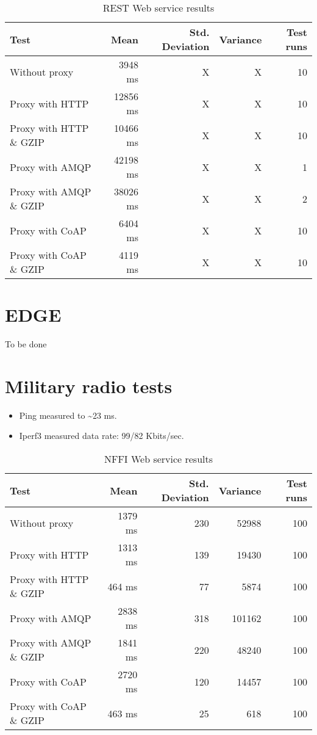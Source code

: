 \begin{appendices}
\begin{table}[H]
\begin{tabular}{| l | r | r | r | r |}
\hline
  \textbf{Test} & \textbf{Mean} & \textbf{Std. Deviation} & \textbf{Variance} & \textbf{Test runs}\\ \hline
  Without proxy & 3948 ms & X & X & 10 \\ \hline
  Proxy with HTTP & 12856 ms & X & X & 10 \\ \hline
  Proxy with HTTP \& GZIP & 10466 ms & X & X & 10 \\ \hline
  Proxy with AMQP & 42198 ms & X & X & 1 \\ \hline
  Proxy with AMQP \& GZIP & 38026 ms & X & X & 2\\ \hline
  Proxy with CoAP & 6404 ms & X & X & 10 \\ \hline
  Proxy with CoAP \& GZIP & 4119 ms & X & X & 10 \\ \hline
\end{tabular}
\caption{REST Web service results}
\end{table}


\section{EDGE}

To be done



\section{Military radio tests}

\begin{itemize}
	\item Ping measured to \textasciitilde 23 ms.
	\item Iperf3 measured data rate: 99/82 Kbits/sec.
\end{itemize}

\begin{table}[H]
\begin{tabular}{| l | r | r | r | r |}
\hline
  \textbf{Test} & \textbf{Mean} & \textbf{Std. Deviation} & \textbf{Variance} & \textbf{Test runs}\\ \hline
  Without proxy & 1379 ms & 230 & 52988 & 100 \\ \hline
  Proxy with HTTP & 1313 ms & 139 & 19430 & 100 \\ \hline
  Proxy with HTTP \& GZIP & 464 ms & 77 & 5874 & 100 \\ \hline
  Proxy with AMQP & 2838 ms & 318 & 101162 & 100 \\ \hline
  Proxy with AMQP \& GZIP & 1841 ms & 220 & 48240 & 100\\ \hline
  Proxy with CoAP & 2720 ms & 120 & 14457 & 100 \\ \hline
  Proxy with CoAP \& GZIP & 463 ms & 25 & 618 & 100 \\ \hline
\end{tabular}
\caption{NFFI Web service results}
\end{table}



\end{appendices}
